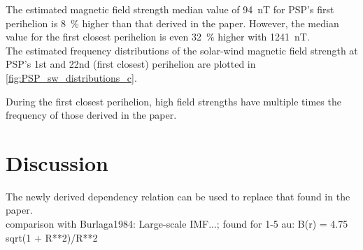 The estimated magnetic field strength median value of \SI{94}{\nano\tesla} for PSP's first perihelion is \SI{8}{\%} higher than that derived in the paper. However, the median value for the first closest perihelion is even \SI{32}{\%} higher with \SI{1241}{\nano\tesla}.\\

The estimated frequency distributions of the solar-wind magnetic field strength at PSP's 1st and 22nd (first closest) perihelion are plotted in \autoref{fig:PSP_sw_distributions_c}.
\begin{figure}[htb]
\end{figure}
During the first closest perihelion, high field strengths have multiple times the frequency of those derived in the paper.\\


\section{Discussion}
The newly derived dependency relation can be used to replace that found in the paper.\\

comparison with Burlaga1984: Large-scale IMF...; found for 1-5 au: B(r) = 4.75 sqrt(1 + R**2)/R**2\\


